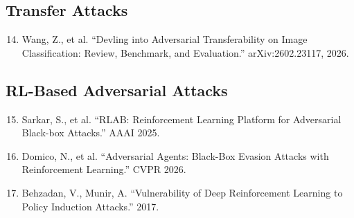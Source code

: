 \documentclass[11pt,a4paper]{article}
\begin{document}
\subsection*{Transfer Attacks}

\begin{enumerate}
\setcounter{enumi}{13}
    \item Wang, Z., et al. ``Devling into Adversarial Transferability on Image Classification: Review, Benchmark, and Evaluation.'' arXiv:2602.23117, 2026.
\end{enumerate}

\subsection*{RL-Based Adversarial Attacks}

\begin{enumerate}
\setcounter{enumi}{14}
    \item Sarkar, S., et al. ``RLAB: Reinforcement Learning Platform for Adversarial Black-box Attacks.'' AAAI 2025.

    \item Domico, N., et al. ``Adversarial Agents: Black-Box Evasion Attacks with Reinforcement Learning.'' CVPR 2026.

    \item Behzadan, V., Munir, A. ``Vulnerability of Deep Reinforcement Learning to Policy Induction Attacks.'' 2017.
\end{enumerate}
\end{document}
